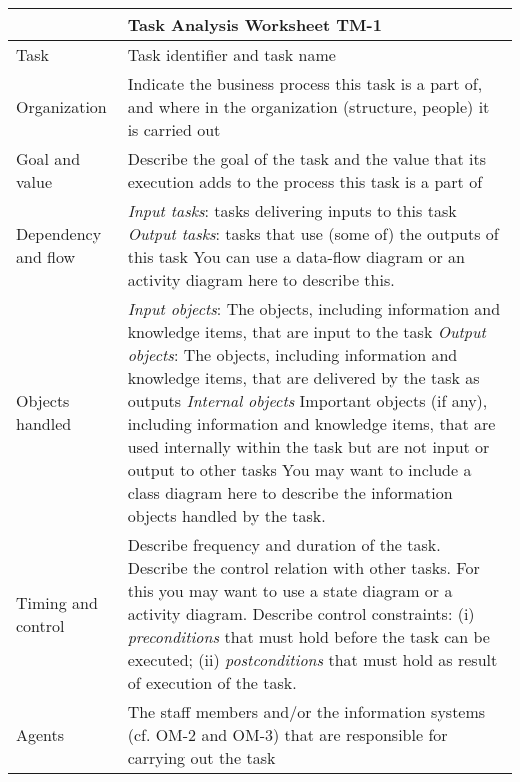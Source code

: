 \begin{tabular}%
       {|>{\colleft}p{2.5cm}%
        |>{\colleft}p{9cm}|}
\hline
{\bf Task Model} &
{\bf Task Analysis Worksheet TM-1} \\
\hline
\hline
\sc Task & 
   Task identifier and task name
\\
\hline
\sc Organization & 
   Indicate the business process this task is a part of, and
   where in the organization (structure, people) it is carried out
\\
\hline
\sc Goal and value &
   Describe the goal of the task and the value that its execution adds
   to the process this task is a part of
\\
\hline
\sc Dependency and flow &
   {\em Input tasks}: tasks delivering inputs to this task
	\newline
   {\em Output tasks}: tasks that use (some of) the outputs of this
    task \newline
You can use a data-flow diagram or an activity diagram here to
describe this.
\\
\hline
\sc Objects handled &
   {\em Input objects}: 
   The objects, including information and knowledge items, that are
   input to the task
\newline
   {\em Output objects}: 
   The objects, including information and knowledge items, that are
   delivered by the task as outputs
\newline
   {\em Internal objects}
   Important objects (if any), including information and knowledge
   items, that are used internally within the task but are not input
   or output to other tasks
\newline
You may want to include a class diagram here to describe the
information objects handled by the task. 
\\
\hline
\sc Timing and control & 
Describe frequency and duration  of the task. \newline
Describe the control relation with other tasks. For this 
you may want to use a state diagram or a activity diagram. \newline
Describe control constraints: \newline
(i) {\em preconditions} that must hold before the task can be
executed; \newline
(ii) {\em postconditions} that must hold as result of execution of
   the task.
\\
\hline
\sc Agents & 
   The staff members
   and/or the information systems (cf. OM-2 and OM-3)
   that are responsible for carrying out the task

\end{tabular}
